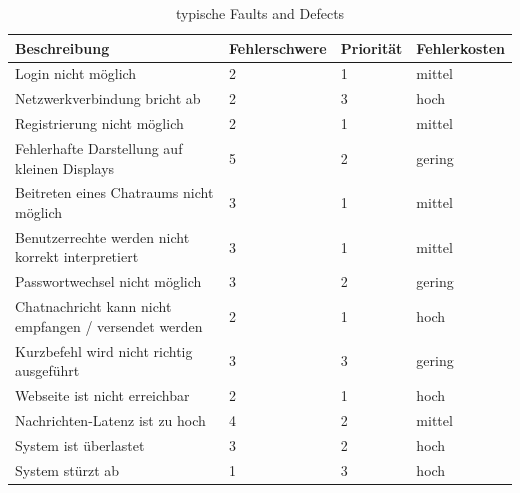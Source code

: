 \begin{table}[H]
    \begin{tabular}{l|l|l|l}
        Beschreibung                                          & Fehlerschwere & Priorität & Fehlerkosten \\ \hline
        Login nicht möglich                                   & 2             & 1         & mittel       \\ \hline
        Netzwerkverbindung bricht ab                          & 2             & 3         & hoch         \\ \hline
        Registrierung nicht möglich                           & 2             & 1         & mittel       \\ \hline
        Fehlerhafte Darstellung auf kleinen Displays          & 5             & 2         & gering       \\ \hline
        Beitreten eines Chatraums nicht möglich               & 3             & 1         & mittel       \\ \hline
        Benutzerrechte werden nicht korrekt interpretiert     & 3             & 1         & mittel       \\ \hline
        Passwortwechsel nicht möglich                         & 3             & 2         & gering       \\ \hline
        Chatnachricht kann nicht empfangen / versendet werden & 2             & 1         & hoch         \\ \hline
        Kurzbefehl wird nicht richtig ausgeführt              & 3             & 3         & gering       \\ \hline
        Webseite ist nicht erreichbar                         & 2             & 1         & hoch         \\ \hline
        Nachrichten-Latenz ist zu hoch                        & 4             & 2         & mittel       \\ \hline
        System ist überlastet                                 & 3             & 2         & hoch         \\ \hline
        System stürzt ab                                      & 1             & 3         & hoch        
    \end{tabular}
    \caption{typische Faults and Defects}
    \label{tab:FaultsAndDeffects}
\end{table}



